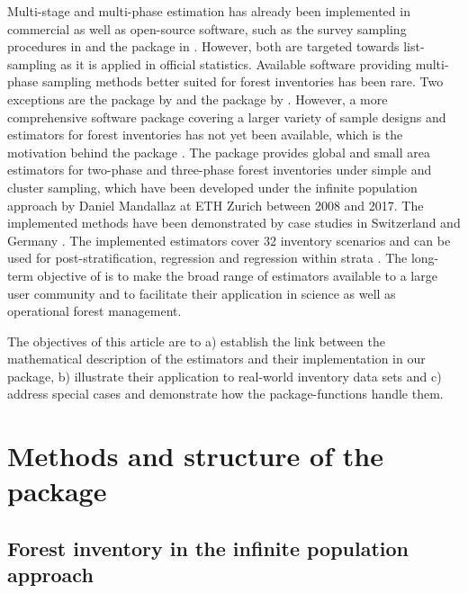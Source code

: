 Multi-stage and multi-phase estimation has already been implemented in commercial as well as open-source software, such as the survey sampling procedures in  \citep{sas} and the  package in  \citep{survey}. However, both are targeted towards list-sampling as it is applied in official statistics. Available software providing multi-phase sampling methods better suited for forest inventories has been rare. Two exceptions are the  package  by \citet{josae2015} and the  package by \citet{cullmann2016}. However, a more comprehensive software package covering a larger variety of sample designs and estimators for forest inventories has not yet been available, which is the motivation behind the  package . The package provides global and small area estimators for two-phase and three-phase forest inventories under simple and cluster sampling, which have been developed under the infinite population approach by Daniel Mandallaz at ETH Zurich between 2008 and 2017. The implemented methods have been demonstrated by case studies in Switzerland \citep{massey2014a, massey2015b, mandallaz2013b} and Germany \citep{hill2017a}. The implemented estimators cover 32 inventory scenarios and can be used for post-stratification, regression and regression within strata \citep{massey2015}. The long-term objective of  is to make the broad range of estimators available to a large user community and to facilitate their application in science as well as operational forest management.

The objectives of this article are to a) establish the link between the mathematical description of the estimators and their implementation in our package, b) illustrate their application to real-world inventory data sets and c) address special cases and demonstrate how the package-functions handle them.

\newpage


\section{Methods and structure of the package}
\label{sec:str_and_mod}


\subsection{Forest inventory in the infinite population approach}

